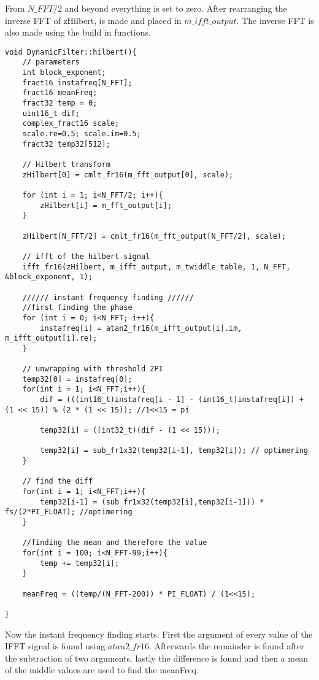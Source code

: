 From $N\_FFT/2$ and beyond everything is set to zero. 
After rearranging the inverse FFT of zHilbert, is made and placed in $m\_ifft\_output$. The inverse FFT is also made using the build in functions.
\begin{verbatim}
void DynamicFilter::hilbert(){
	// parameters
	int block_exponent;
	fract16 instafreq[N_FFT];
	fract16 meanFreq;
	fract32 temp = 0;
	uint16_t dif;
	complex_fract16 scale;
	scale.re=0.5; scale.im=0.5;
	fract32 temp32[512];
			
	// Hilbert transform
	zHilbert[0] = cmlt_fr16(m_fft_output[0], scale);
	
	for (int i = 1; i<N_FFT/2; i++){
		zHilbert[i] = m_fft_output[i];
	}
		
	zHilbert[N_FFT/2] = cmlt_fr16(m_fft_output[N_FFT/2], scale);
	
	// ifft of the hilbert signal
	ifft_fr16(zHilbert, m_ifft_output, m_twiddle_table, 1, N_FFT, &block_exponent, 1);
		
	////// instant frequency finding //////
	//first finding the phase
	for (int i = 0; i<N_FFT; i++){
		instafreq[i] = atan2_fr16(m_ifft_output[i].im, m_ifft_output[i].re);
	}
	
	// unwrapping with threshold 2PI
	temp32[0] = instafreq[0];
	for(int i = 1; i<N_FFT;i++){
		dif = (((int16_t)instafreq[i - 1] - (int16_t)instafreq[i]) + (1 << 15)) % (2 * (1 << 15)); //1<<15 = pi
		
		temp32[i] = ((int32_t)(dif - (1 << 15)));
			
		temp32[i] = sub_fr1x32(temp32[i-1],	temp32[i]); // optimering
	}
		
	// find the diff
	for(int i = 1; i<N_FFT;i++){
		temp32[i-1] = (sub_fr1x32(temp32[i],temp32[i-1])) * fs/(2*PI_FLOAT); //optimering
	}
		
	//finding the mean and therefore the value
	for(int i = 100; i<N_FFT-99;i++){
		temp += temp32[i];
	}
		
	meanFreq = ((temp/(N_FFT-200)) * PI_FLOAT) / (1<<15);
		
}
\end{verbatim}
Now the instant frequency finding starts. First the argument of every value of the IFFT signal is found using $atan2\_fr16$. Afterwards the remainder is found after the subtraction of two arguments. lastly the difference is found and then a mean of the middle values are used to find the meanFreq.

